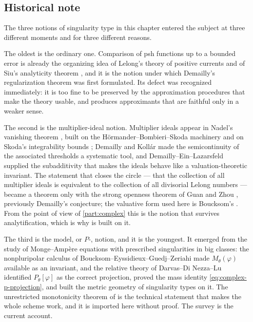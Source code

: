 \subsection{Historical note}
\label{sec:ch51-history}

The three notions of singularity type in this chapter entered the subject
at three different moments and for three different reasons.

The oldest is the ordinary one.  Comparison of psh functions up to a
bounded error is already the organizing idea of Lelong's theory of
positive currents \cite{Lel68} and of Siu's analyticity theorem
\cite{Siu74}, and it is the notion under which Demailly's regularization
theorem \cite{Dem92reg} was first formulated.  Its defect was recognized
immediately: it is too fine to be preserved by the approximation
procedures that make the theory usable, and
 produces approximants that are
faithful only in a weaker sense.

The second is the multiplier-ideal notion.  Multiplier ideals appear in
Nadel's vanishing theorem \cite{Nad89,Nad90}, built on the
H\"ormander--Bombieri--Skoda machinery and on Skoda's integrability
bounds \cite{Sko72}; Demailly and Kollár \cite{DK01} made the
semicontinuity of the associated thresholds a systematic tool, and
Demailly--Ein--Lazarsfeld \cite{DEL00} supplied the subadditivity that
makes the ideals behave like a valuation-theoretic invariant.  The
statement that closes the circle --- that the collection of all
multiplier ideals is equivalent to the collection of all divisorial
Lelong numbers --- became a theorem only with the strong openness theorem
of Guan and Zhou \cite{GZ15}, previously Demailly's conjecture; the
valuative form used here is Boucksom's \cite{Bou17}.  From the point of
view of \cref{part:complex} this is the notion that survives
analytification, which is why  is
built on it.

The third is the model, or \(P\)-, notion, and it is the youngest.  It
emerged from the study of Monge--Amp\`ere equations with prescribed
singularities in big classes: the nonpluripolar calculus of
Boucksom--Eyssidieux--Guedj--Zeriahi \cite{BEGZ10} made
\(M_\theta(\varphi)\) available as an invariant, and the relative theory
of Darvas--Di Nezza--Lu \cite{DDNL18mono,DDNL18big,DDNL18fullmass,%
DDNL19log,DDNLmetric} identified \(P_\theta[\varphi]\) as the correct
projection, proved the mass identity \eqref{eq:complex-p-projection}, and
built the metric geometry of singularity types on it.  The unrestricted
monotonicity theorem of \cite{DDNL18mono} is the technical statement that
makes the whole scheme work, and it is imported here without proof.  The
survey \cite{DDNLsurv} is the current account.

